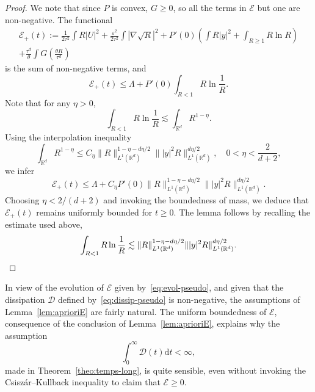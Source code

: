 \documentclass[AHL,Unicode,longabstracts]{cedram}
\newcommand*\R{\mathbb{R}}
\newcommand*\dd {\mathrm{d}}
\newcommand*\<{\left\langle}
\renewcommand*\>{\right\rangle}
\renewcommand*\le{\leqslant}
\renewcommand*\ge{\geqslant}
\newcommand*\eps{\varepsilon}
\begin{document}
\begin{proof}
We note that since $P$ is convex, $G\ge0 $, so all the terms in $\mathcal E$ but one are non-negative. The functional
\begin{multline*}
\mathcal E_+(t) := \frac{1}{2\tau^2}\int R|U|^2+\frac{\eps^2}{2\tau^2} \int|\nabla \sqrt R|^2 +P'(0)\left(\int R|y|^2 + \int_{R\ge 1} R \ln R\right) \\
+ \frac{\tau^d}{\theta}\int G\left(\frac{\theta R}{\tau^d}\right)
\end{multline*}
is the sum of non-negative terms, and
\begin{equation*}
\mathcal E_+(t)\le \Lambda+ P'(0)\int_{R< 1} R \ln \frac{1}{R}.
\end{equation*}
Note that for any $\eta>0$,
\begin{equation*}
\int_{R< 1} R \ln \frac{1}{R} \lesssim \int_{\R^d} R^{1-\eta}.
\end{equation*}
Using the interpolation inequality
\begin{equation*}
\int_{\R^d} R^{1-\eta} \le C_{\eta}
\|R\|_{L^1(\R^d)}^{1-\eta-d\eta/2}\||y|^2 R\|_{L^1(\R^d)}^{d\eta/2},\quad 0<\eta<\frac{2}{d+2},
\end{equation*}
we infer
\begin{equation*}
\mathcal E_+(t)\le \Lambda+ C_\eta P'(0)\|R\|_{L^1(\R^d)}^{1-\eta-d\eta/2}\||y|^2 R\|_{L^1(\R^d)}^{d\eta/2}.
\end{equation*}
Choosing $\eta<2/(d+2)$ and invoking the boundedness of mass, we deduce that $ \mathcal E_+(t)$ remains uniformly bounded for $t \ge 0$. The lemma follows by recalling the estimate used above,
\begin{equation*}
\int_{R< 1} R \ln \frac{1}{R} \lesssim
\|R\|_{L^1(\R^d)}^{1-\eta-d\eta/2}\||y|^2 R\|_{L^1(\R^d)}^{d\eta/2}.\qedhere
\end{equation*}
\end{proof}

\begin{rema}
In view of the evolution of $\mathcal E$ given by~\eqref{eq:evol-pseudo}, and given that the dissipation $\mathcal D$ defined by~\eqref{eq:dissip-pseudo} is non-negative, the assumptions of Lemma~\ref{lem:aprioriE} are fairly natural. The uniform boundedness of $\mathcal E$, consequence of the conclusion of Lemma~\ref{lem:aprioriE}, explains why the assumption
\[
\int_0^\infty \mathcal D(t)\dd t<\infty,
\]
made in Theorem~\ref{theo:temps-long}, is quite sensible, even without invoking the Csisz\'ar--Kullback inequality to claim that $\mathcal E\ge 0$.
\end{rema}
\end{document}

